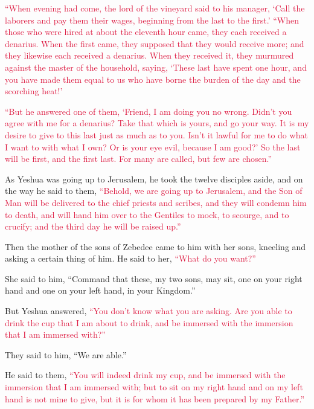 \myverse{}\textcolor{crimson}{“When evening had come, the lord of the vineyard said to his	manager, ‘Call the laborers and pay them their wages, beginning from the last to the first.’}
\myverse{}\textcolor{crimson}{“When those who were hired at about the eleventh hour came, they each received
	a denarius.
}
\myverse{}\textcolor{crimson}{When the first came, they supposed that they would receive more; and they likewise each received a denarius.
}
\myverse{}\textcolor{crimson}{When they received it, they murmured against the master of the household,
}
\myverse{}\textcolor{crimson}{saying, ‘These last have spent one hour, and you have made them equal
	to us who have borne the burden of the day and the scorching heat!’
}

\myverse{}\textcolor{crimson}{“But he answered one of them, ‘Friend, I am doing you no wrong. Didn’t you agree with me for a denarius?
} \myverse{}\textcolor{crimson}{Take that which is yours, and go your way. It is my desire to give to this last just as much as to you.
}
\myverse{}\textcolor{crimson}{Isn’t it lawful for me to do what I want to with what I own? Or is your
	eye evil, because I am good?’
}
\myverse{}\textcolor{crimson}{So the last will be first, and the first last. For many are called, but
	few are chosen.”}

\myverse{}As Yeshua was going up to Jerusalem, he took the twelve disciples
aside, and on the way he said to them,
\myverse{}\textcolor{crimson}{“Behold, we are going up to Jerusalem, and the Son of Man will be delivered
	to the chief priests and scribes, and they will condemn him to death,
}
\myverse{}\textcolor{crimson}{and will hand him over to the Gentiles to mock, to scourge, and to crucify;
	and the third day he will be raised up.”}

\myverse{}Then the mother of the sons of Zebedee came to him with her
sons, kneeling and asking a certain thing of him.
\myverse{}He said to her,
\textcolor{crimson}{“What do you want?”}

She said to him, “Command that these, my two sons, may sit, one on your right hand and one
on your left hand, in your Kingdom.”

\myverse{}But Yeshua answered,
\textcolor{crimson}{“You don’t know what you are asking. Are you able to drink the cup that I am about to drink, and be
	immersed with the immersion that I am immersed with?”}

They said to him, “We are able.”

\myverse{}He said to them,
\textcolor{crimson}{“You will indeed drink my cup, and be immersed with the immersion that I am immersed with; but to
	sit on my right hand and on my left hand is not mine to give, but it is for whom it has been prepared
	by my Father.”}

